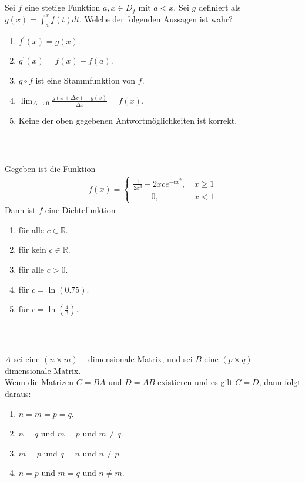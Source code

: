 \subsection*{}
Sei $ f $ eine stetige Funktion $ a, x \in D_f $ mit $ a < x $.
Sei $ g $ definiert als $ g(x) = \int_a^x f(t) dt $.
Welche der folgenden Aussagen ist wahr?  
\renewcommand{\labelenumi}{(\alph{enumi})}
\begin{enumerate}
	\item 
	$ f^\prime(x) = g(x) $.
	\item
	$ g^\prime(x) = f(x) - f(a) $.
	\item
	$ g \circ f  $ ist eine Stammfunktion von $ f $.
	\item
	$ \lim_{\Delta \to 0} \frac{g(x+ \Delta x) - g(x)}{\Delta x} = f(x) $.
	\item
	Keine der oben gegebenen Antwortmöglichkeiten ist korrekt.
\end{enumerate}
\ \\
\subsection*{}
Gegeben ist die Funktion
\begin{align*}
f(x) =
\begin{cases}
	\frac{1}{2 x^3} + 2 x c e^{-c x^2}, \ &x \geq 1\\
 \qquad	\ 0 , \ &x < 1
\end{cases}
\end{align*}
Dann ist $ f $ eine Dichtefunktion
\renewcommand{\labelenumi}{(\alph{enumi})}
\begin{enumerate}
\item 
für alle $ c \in \mathbb{R} $.
\item 
für kein $ c \in \mathbb{R} $.
\item 
für alle $ c > 0 $.
\item 
für $ c = \ln(0.75) $.
\item
für $ c = \ln\left(\frac{4}{3}\right) $.
\end{enumerate}
\ \\
\subsection*{}
$ A $ sei eine $ (n \times m )- $dimensionale Matrix, und sei $ B $ eine $ (p \times q)- $dimensionale Matrix.\\
Wenn die Matrizen $ C = BA $ und $ D = AB $ existieren und es gilt $ C = D $, dann folgt daraus:
\renewcommand{\labelenumi}{(\alph{enumi})}
\begin{enumerate}
	\item 
	$ n= m = p = q $.
	\item 
	$ n = q $ und $ m= p $ und $ m \neq q $.
	\item
	$ m= p $ und $ q = n$ und $ n \neq p $.
	\item
	$ n = p $ und $ m= q $ und $ n \neq m $.
\end{enumerate}
\ \\
